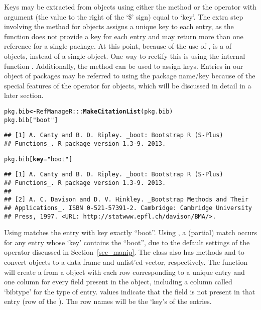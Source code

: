 \documentclass[article]{jss}\usepackage[]{graphicx}\usepackage[]{color}
\makeatletter
\newcommand{\hlstr}[1]{\textcolor[rgb]{0.125,0.125,1}{#1}}%
\newcommand{\hlstd}[1]{\textcolor[rgb]{0.251,0.251,0.282}{#1}}%
\newcommand{\hlkwb}[1]{\textcolor[rgb]{0.439,0.251,1}{\textbf{#1}}}%
\newcommand{\hlkwc}[1]{\textcolor[rgb]{0.529,0,0.184}{\textbf{#1}}}%
\newcommand{\hlkwd}[1]{\textcolor[rgb]{0.251,0.251,0.282}{\textbf{#1}}}%
\newenvironment{kframe}{%
 \def\at@end@of@kframe{}%
 \ifinner\ifhmode%
  \def\at@end@of@kframe{\end{minipage}}%
  \begin{minipage}{\columnwidth}%
 \fi\fi%
 \def\FrameCommand##1{\hskip\@totalleftmargin \hskip-\fboxsep
 \colorbox{shadecolor}{##1}\hskip-\fboxsep
     \hskip-\linewidth \hskip-\@totalleftmargin \hskip\columnwidth}%
 \MakeFramed {\advance\hsize-\width
   \@totalleftmargin\z@ \linewidth\hsize
   \@setminipage}}%
 {\par\unskip\endMakeFramed%
 \at@end@of@kframe}
\newenvironment{knitrout}{}{} %
\newcommand{\bt}{\`{}}
\makeatother
\begin{document}
Keys may be extracted from  objects using either the  method or the \code{\bt$\bt} operator with  argument (the value to the right of the `\$' sign) equal to `key'.  The extra step involving the \code{\bt names<-\bt} method for  objects assigns a unique key to each entry, as the  function does not provide a key for each entry and may return more than one reference for a single package.  At this point, because of the use of ,  is a  of  objects, instead of a single  object.  One way to rectify this is using the internal function .  Additionally, the \code{\bt names<-\bt} method can be used to assign keys.  Entries in our  object of packages may be referred to using the package name/key because of the special features of the \code{\bt[\bt} operator for  objects, which will be discussed in detail in a later section.
\begin{knitrout}
\color{fgcolor}\begin{kframe}
\begin{alltt}
\hlstd{pkg.bib} \hlkwb{<-} \hlstd{RefManageR:::}\hlkwd{MakeCitationList}\hlstd{(pkg.bib)}
\hlstd{pkg.bib[}\hlstr{"boot"}\hlstd{]}
\end{alltt}
\begin{verbatim}
## [1] A. Canty and B. D. Ripley. _boot: Bootstrap R (S-Plus)
## Functions_. R package version 1.3-9. 2013.
\end{verbatim}
\begin{alltt}
\hlstd{pkg.bib[}\hlkwc{key} \hlstd{=} \hlstr{"boot"}\hlstd{]}
\end{alltt}
\begin{verbatim}
## [1] A. Canty and B. D. Ripley. _boot: Bootstrap R (S-Plus)
## Functions_. R package version 1.3-9. 2013.
## 
## [2] A. C. Davison and D. V. Hinkley. _Bootstrap Methods and Their
## Applications_. ISBN 0-521-57391-2. Cambridge: Cambridge University
## Press, 1997. <URL: http://statwww.epfl.ch/davison/BMA/>.
\end{verbatim}
\end{kframe}
\end{knitrout}

Using  matches the entry with key exactly ``boot''.  Using , a (partial) match occurs for any entry whose `key' contains the  ``boot'', due to the default settings of the \code{\bt[\bt} operator discussed in Section~\ref{sec_manip}.
The  class also has methods  and  to convert  objects to a data frame and unlist'ed vector, respectively.  The function  will create  a  from a  object with each row corresponding to a unique entry and one column for every field present in the  object, including a column called `bibtype' for the type of entry.   values indicate that the field is not present in that entry (row of the ).  The row names will be the `key's of the entries.
\end{document}
